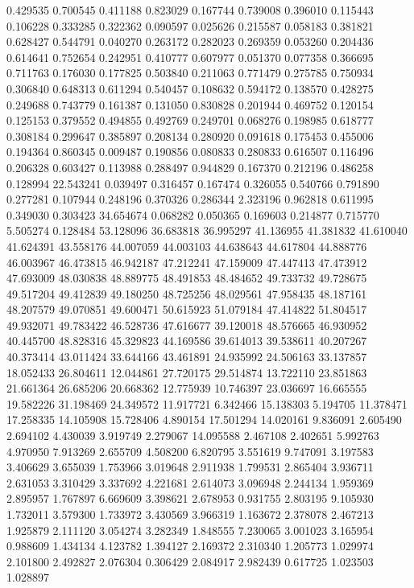 0.429535
0.700545
0.411188
0.823029
0.167744
0.739008
0.396010
0.115443
0.106228
0.333285
0.322362
0.090597
0.025626
0.215587
0.058183
0.381821
0.628427
0.544791
0.040270
0.263172
0.282023
0.269359
0.053260
0.204436
0.614641
0.752654
0.242951
0.410777
0.607977
0.051370
0.077358
0.366695
0.711763
0.176030
0.177825
0.503840
0.211063
0.771479
0.275785
0.750934
0.306840
0.648313
0.611294
0.540457
0.108632
0.594172
0.138570
0.428275
0.249688
0.743779
0.161387
0.131050
0.830828
0.201944
0.469752
0.120154
0.125153
0.379552
0.494855
0.492769
0.249701
0.068276
0.198985
0.618777
0.308184
0.299647
0.385897
0.208134
0.280920
0.091618
0.175453
0.455006
0.194364
0.860345
0.009487
0.190856
0.080833
0.280833
0.616507
0.116496
0.206328
0.603427
0.113988
0.288497
0.944829
0.167370
0.212196
0.486258
0.128994
22.543241
0.039497
0.316457
0.167474
0.326055
0.540766
0.791890
0.277281
0.107944
0.248196
0.370326
0.286344
2.323196
0.962818
0.611995
0.349030
0.303423
34.654674
0.068282
0.050365
0.169603
0.214877
0.715770
5.505274
0.128484
53.128096
36.683818
36.995297
41.136955
41.381832
41.610040
41.624391
43.558176
44.007059
44.003103
44.638643
44.617804
44.888776
46.003967
46.473815
46.942187
47.212241
47.159009
47.447413
47.473912
47.693009
48.030838
48.889775
48.491853
48.484652
49.733732
49.728675
49.517204
49.412839
49.180250
48.725256
48.029561
47.958435
48.187161
48.207579
49.070851
49.600471
50.615923
51.079184
47.414822
51.804517
49.932071
49.783422
46.528736
47.616677
39.120018
48.576665
46.930952
40.445700
48.828316
45.329823
44.169586
39.614013
39.538611
40.207267
40.373414
43.011424
33.644166
43.461891
24.935992
24.506163
33.137857
18.052433
26.804611
12.044861
27.720175
29.514874
13.722110
23.851863
21.661364
26.685206
20.668362
12.775939
10.746397
23.036697
16.665555
19.582226
31.198469
24.349572
11.917721
6.342466
15.138303
5.194705
11.378471
17.258335
14.105908
15.728406
4.890154
17.501294
14.020161
9.836091
2.605490
2.694102
4.430039
3.919749
2.279067
14.095588
2.467108
2.402651
5.992763
4.970950
7.913269
2.655709
4.508200
6.820795
3.551619
9.747091
3.197583
3.406629
3.655039
1.753966
3.019648
2.911938
1.799531
2.865404
3.936711
2.631053
3.310429
3.337692
4.221681
2.614073
3.096948
2.244134
1.959369
2.895957
1.767897
6.669609
3.398621
2.678953
0.931755
2.803195
9.105930
1.732011
3.579300
1.733972
3.430569
3.966319
1.163672
2.378078
2.467213
1.925879
2.111120
3.054274
3.282349
1.848555
7.230065
3.001023
3.165954
0.988609
1.434134
4.123782
1.394127
2.169372
2.310340
1.205773
1.029974
2.101800
2.492827
2.076304
0.306429
2.084917
2.982439
0.617725
1.023503
1.028897
